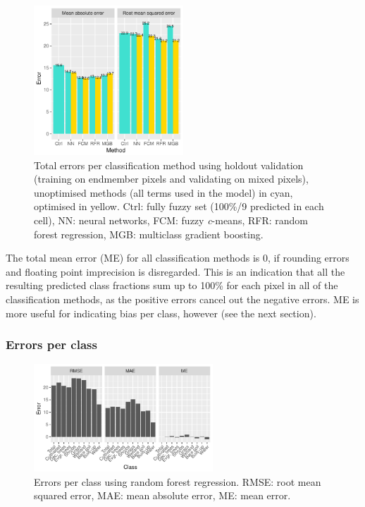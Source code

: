 \documentclass[a4paper,12pt]{scrbook}
\begin{document}
\begin{figure}
  \centering
  \includegraphics[width=0.5\textwidth]{thesis-figures/total-errors-gb}
  \caption{Total errors per classification method using holdout validation (training on endmember pixels and validating on mixed pixels), unoptimised methods (all terms used in the model) in cyan, optimised in yellow. Ctrl: fully fuzzy set (100\%/9 predicted in each cell), NN: neural networks, FCM: fuzzy \textit{c}-means, RFR: random forest regression, MGB: multiclass gradient boosting.}
  \label{fig-total-errors-gb}
\end{figure}

The total mean error (ME) for all classification methods is 0, if rounding errors and floating point imprecision is disregarded. This is an indication that all the resulting predicted class fractions sum up to 100\% for each pixel in all of the classification methods, as the positive errors cancel out the negative errors. ME is more useful for indicating bias per class, however (see the next section).

\subsubsection{Errors per class}

\begin{figure}
  \centering
  \includegraphics[width=0.6\textwidth]{thesis-figures/perclass-errors-rf}
  \caption{Errors per class using random forest regression. RMSE: root mean squared error, MAE: mean absolute error, ME: mean error.}
  \label{fig-perclass-errors-rf}
\end{figure}
\end{document}
